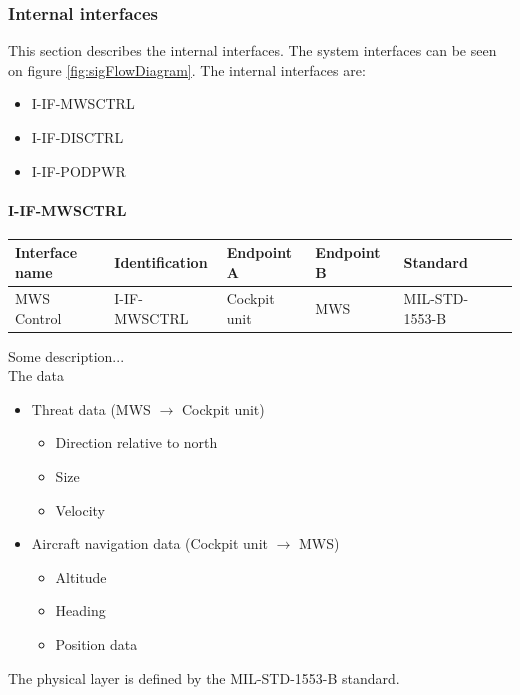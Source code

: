 \newpage

\subsubsection{Internal interfaces}
This section describes the internal interfaces. The system interfaces can be seen on figure \ref{fig:sigFlowDiagram}. The internal interfaces are:

\begin{itemize}
\item I-IF-MWSCTRL
\item I-IF-DISCTRL
\item I-IF-PODPWR
\end{itemize}

\paragraph{I-IF-MWSCTRL}

\begin{center}
\begin{tabular}{ | p{2cm} | l | p{2.3cm} | p{2.3cm} | l | p{1cm} |}
\hline
 \textbf{Interface name} & \textbf{Identification} & \textbf{Endpoint A} & \textbf{Endpoint B} & \textbf{Standard}\\ \hline

 MWS Control & I-IF-MWSCTRL & Cockpit unit & MWS & MIL-STD-1553-B\\ \hline

\end{tabular}
\end{center}

Some description...
\\
The data 
\begin{itemize}
\item Threat data (MWS $\rightarrow$ Cockpit unit)
	\begin{itemize}
	\item Direction relative to north
	\item Size
	\item Velocity
	\end{itemize}
\item Aircraft navigation data (Cockpit unit $\rightarrow$ MWS)
	\begin{itemize}
	\item Altitude
	\item Heading
	\item Position data
	\end{itemize}
\end{itemize}
The physical layer is defined by the MIL-STD-1553-B standard.


